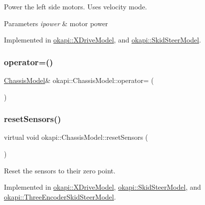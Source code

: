 Power the left side motors. Uses velocity mode.


\begin{DoxyParams}{Parameters}
{\em ipower} & motor power \\
\hline
\end{DoxyParams}


Implemented in \mbox{\hyperlink{classokapi_1_1XDriveModel_a0a4688df022b66164e81709e6eaa02e5}{okapi\+::\+X\+Drive\+Model}}, and \mbox{\hyperlink{classokapi_1_1SkidSteerModel_af2b00108853b82eb0fb5ecb3b71f413d}{okapi\+::\+Skid\+Steer\+Model}}.

\mbox{\label{classokapi_1_1ChassisModel_ab6c89183b8a5317a1e149df5ed22dfb1}} 
\subsubsection{\texorpdfstring{operator=()}{operator=()}}
{\footnotesize\ttfamily \mbox{\hyperlink{classokapi_1_1ChassisModel}{Chassis\+Model}}\& okapi\+::\+Chassis\+Model\+::operator= (\begin{DoxyParamCaption}\item[{const \mbox{\hyperlink{classokapi_1_1ChassisModel}{Chassis\+Model}} \&}]{ }\end{DoxyParamCaption})\hspace{0.3cm}{\ttfamily [delete]}}

\mbox{\label{classokapi_1_1ChassisModel_a6bd7e6bb60d41d3f1f5a5a129acfe1b6}} 
\subsubsection{\texorpdfstring{resetSensors()}{resetSensors()}}
{\footnotesize\ttfamily virtual void okapi\+::\+Chassis\+Model\+::reset\+Sensors (\begin{DoxyParamCaption}{ }\end{DoxyParamCaption})\hspace{0.3cm}{\ttfamily [pure virtual]}}

Reset the sensors to their zero point. 

Implemented in \mbox{\hyperlink{classokapi_1_1XDriveModel_adbc23b11cde6aebb3c7eefb1f0251af7}{okapi\+::\+X\+Drive\+Model}}, \mbox{\hyperlink{classokapi_1_1SkidSteerModel_af8885fc16e654eafa872dd7c760591cf}{okapi\+::\+Skid\+Steer\+Model}}, and \mbox{\hyperlink{classokapi_1_1ThreeEncoderSkidSteerModel_a6e4d43a1f3027798c0451c93f8cde057}{okapi\+::\+Three\+Encoder\+Skid\+Steer\+Model}}.

